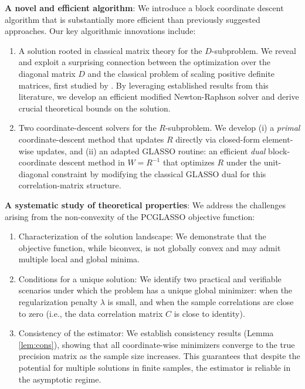 \documentclass[12pt]{amsart}
\numberwithin{equation}{section}
\numberwithin{equation}{section}
\theoremstyle{plain}
\theoremstyle{definition}
\begin{document}
\textbf{A novel and efficient algorithm}: We introduce a block coordinate descent algorithm that is substantially more efficient than previously suggested approaches. Our key algorithmic innovations include:
\begin{enumerate}
    \item A solution rooted in classical matrix theory for the $D$-subproblem. We reveal and exploit a surprising connection between the optimization over the diagonal matrix $D$ and the classical problem of scaling positive definite matrices, first studied by \cite{MO68}. By leveraging established results from this literature, we develop an efficient modified Newton-Raphson solver and derive crucial theoretical bounds on the solution.
    \item Two coordinate-descent solvers for the $R$-subproblem. We develop (i) a \emph{primal} coordinate-descent method that updates $R$ directly via closed-form element-wise updates, and (ii) an adapted GLASSO routine: an efficient \emph{dual} block-coordinate descent method in $W=R^{-1}$ that optimizes $R$ under the unit-diagonal constraint by modifying the classical GLASSO dual for this correlation-matrix structure.%
\end{enumerate}


\textbf{A systematic study of theoretical properties}: We address the challenges arising from the non-convexity of the PCGLASSO objective function:
\begin{enumerate}
    \item Characterization of the solution landscape: We demonstrate that the objective function, while biconvex, is not globally convex and may admit multiple local and global minima.
    \item Conditions for a unique solution: We identify two practical and verifiable scenarios under which the problem has a unique global minimizer: when the regularization penalty $\lambda$ is small, and when the sample correlations are close to zero (i.e., the data correlation matrix $C$ is close to identity).
    \item Consistency of the estimator: We establish consistency results (Lemma \ref{lem:cons}), showing that all coordinate-wise minimizers converge to the true precision matrix as the sample size increases. This guarantees that despite the potential for multiple solutions in finite samples, the estimator is reliable in the asymptotic regime.
\end{enumerate}
\end{document}
